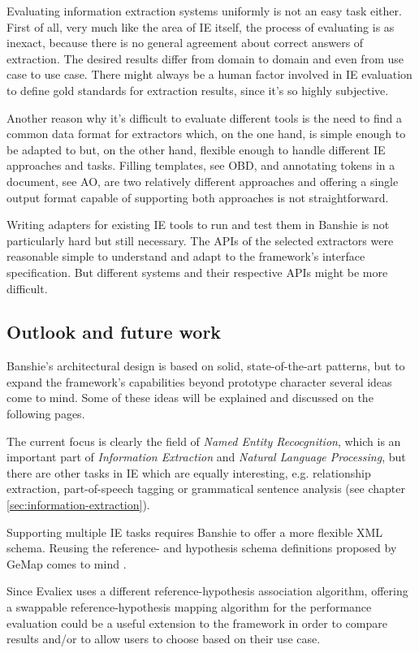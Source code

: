 Evaluating information extraction systems uniformly is not an easy task either. First of all, very much like the area of \gls{IE} itself, the process of evaluating is as inexact, because there is no general agreement about correct answers of extraction. The desired results differ from domain to domain and even from use case to use case. There might always be a human factor involved in \gls{IE} evaluation to define gold standards for extraction results, since it's so highly subjective.

Another reason why it's difficult to evaluate different tools is the need to find a common data format for extractors which, on the one hand, is simple enough to be adapted to but, on the other hand, flexible enough to handle different \gls{IE} approaches and tasks. Filling templates, see \acl{OBD}, and annotating tokens in a document, see \acl{AO}, are two relatively different approaches and offering a single output format capable of supporting both approaches is not straightforward.

Writing adapters for existing \gls{IE} tools to run and test them in Banshie is not particularly hard but still necessary. The APIs of the selected extractors were reasonable simple to understand and adapt to the framework's interface specification. But different systems and their respective APIs might be more difficult.

\subsection{Outlook and future work}
Banshie's architectural design is based on solid, state-of-the-art patterns, but to expand the framework's capabilities beyond prototype character several ideas come to mind. Some of these ideas will be explained and discussed on the following pages.

The current focus is clearly the field of \textit{Named Entity Recocgnition}, which is an important part of \textit{Information Extraction} and \textit{Natural Language Processing}, but there are other tasks in \gls{IE} which are equally interesting, e.g. relationship extraction, part-of-speech tagging or grammatical sentence analysis (see chapter \ref{sec:information-extraction}).

Supporting multiple \gls{IE} tasks requires Banshie to offer a more flexible XML schema. Reusing the reference- and hypothesis schema definitions proposed by GeMap comes to mind \cite{Linsmayr:2010b}.

Since Evaliex uses a different reference-hypothesis association algorithm, offering a swappable reference-hypothesis mapping algorithm for the performance evaluation could be a useful extension to the framework in order to compare results and/or to allow users to choose based on their use case.

